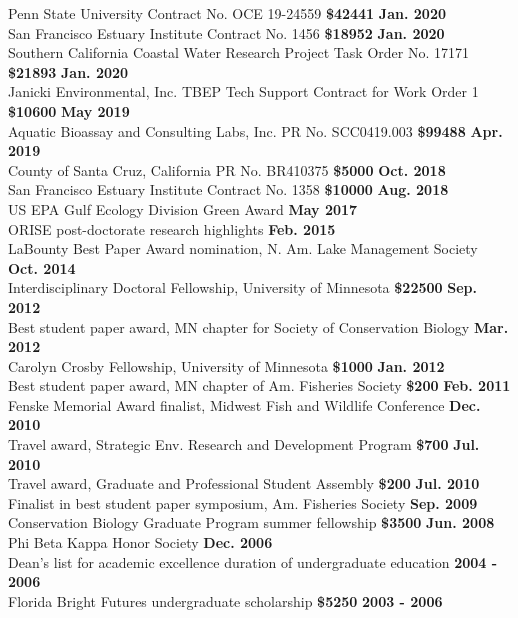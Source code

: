\documentclass[letterpaper,12pt]{article}
\begin{document}
Penn State University Contract No. OCE 19-24559 {\bf \$42441} \hfill {\bf Jan. 2020} \\
San Francisco Estuary Institute Contract No. 1456 {\bf \$18952} \hfill {\bf Jan. 2020} \\
Southern California Coastal Water Research Project Task Order No. 17171 {\bf \$21893} \hfill {\bf Jan. 2020} \\
Janicki Environmental, Inc. TBEP Tech Support Contract for Work Order 1 {\bf \$10600} \hfill {\bf May 2019} \\
Aquatic Bioassay and Consulting Labs, Inc. PR No. SCC0419.003 {\bf \$99488} \hfill {\bf Apr. 2019} \\
County of Santa Cruz, California PR No. BR410375 {\bf \$5000} \hfill {\bf Oct. 2018} \\
San Francisco Estuary Institute Contract No. 1358 {\bf \$10000} \hfill {\bf Aug. 2018} \\
US EPA Gulf Ecology Division Green Award \hfill {\bf May 2017} \\
ORISE post-doctorate research highlights \hfill {\bf Feb. 2015} \\
LaBounty Best Paper Award nomination, N. Am. Lake Management Society \hfill {\bf Oct. 2014} \\
Interdisciplinary Doctoral Fellowship, University of Minnesota {\bf \$22500} \hfill {\bf Sep. 2012} \\
Best student paper award, MN chapter for Society of Conservation Biology \hfill {\bf Mar. 2012} \\
Carolyn Crosby Fellowship, University of Minnesota {\bf \$1000} \hfill {\bf Jan. 2012} \\
Best student paper award, MN chapter of Am. Fisheries Society {\bf \$200} \hfill {\bf Feb. 2011} \\
Fenske Memorial Award finalist, Midwest Fish and Wildlife Conference \hfill {\bf Dec. 2010} \\
Travel award, Strategic Env. Research and Development Program {\bf \$700} \hfill {\bf Jul. 2010} \\
Travel award, Graduate and Professional Student Assembly {\bf \$200} \hfill {\bf Jul. 2010} \\
Finalist in best student paper symposium, Am. Fisheries Society \hfill {\bf Sep. 2009} \\
Conservation Biology Graduate Program summer fellowship {\bf \$3500} \hfill {\bf Jun. 2008} \\
Phi Beta Kappa Honor Society \hfill {\bf Dec. 2006} \\
Dean's list for academic excellence duration of undergraduate education \hfill {\bf 2004 - 2006} \\
Florida Bright Futures undergraduate scholarship {\bf \$5250} \hfill {\bf 2003 - 2006} 
\end{document}
